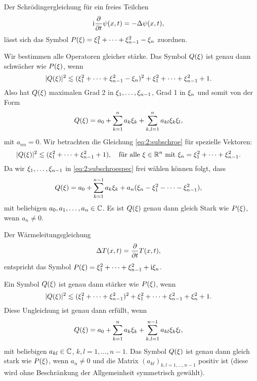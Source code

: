 \begin{exa}\label{exa:schroe}
Der Schrödingergleichung für ein freies Teilchen
\begin{equation}
\mathrm i\frac{\partial}{\partial t}\psi(x,t)=-\Delta\psi(x,t),\end{equation}
lässt sich das Symbol $P(\xi)=\xi^2_1+\dots+\xi^2_{n-1}-\xi_n$ zuordnen.

Wir bestimmen alle Operatoren gleicher stärke.
Das Symbol $Q(\xi)$ ist genau dann schwächer wie $P(\xi)$,
wenn
\begin{equation}\label{eq:2:subschroe}
\abs{Q(\x)}^2\apprle(\x^2_1+\dots+\x^2_{n-1}-\x_n)^2+\x^2_1+\dots+\x^2_{n-1}+1.
\end{equation}
Also hat $Q(\xi)$ maximalen Grad 2 in $\xi_1,\dots,\xi_{n-1}$,
Grad 1 in $\xi_n$ und somit von der Form
\begin{equation}
Q(\xi)=a_0+\sum^n_{k=1}a_k\xi_k+\sum^n_{k,l=1}a_{kl}\xi_k\xi_l,
\end{equation}
mit $a_{nn}=0$.
Wir betrachten die Gleichung \eqref{eq:2:subschroe}
für spezielle Vektoren:
\begin{equation}\label{eq:2:subschroespec}
\abs{Q(\x)}^2\apprle(\x^2_1+\dots+\x^2_{n-1}+1),
\quad\text{für alle}~\x\in\R^n~\text{mit}~\x_n=\x^2_1+\dots+\x^2_{n-1}.
\end{equation}
Da wir $\xi_1,\dots,\xi_{n-1}$ in \eqref{eq:2:subschroespec} frei wählen können folgt, dass
\begin{equation}
Q(\xi)=a_0+\sum_{k=1}^{n-1}a_k\xi_k+a_n(\xi_n-\xi^2_1-\dots-\xi^2_{n-1}),
\end{equation}
mit beliebigen $a_0,a_1,\dots,a_n\in\mathbb C$.
Es ist $Q(\xi)$ genau dann gleich Stark wie $P(\xi)$,
wenn $a_n\neq0$.
\end{exa}

\begin{exa}\label{exa:heat}
Der Wärmeleitungsgleichung
\begin{equation}
\Delta T(x,t)=\frac{\partial}{\partial t}T(x,t),
\end{equation}
entspricht das Symbol $P(\xi)=\xi^2_1+\dots+\xi^2_{n-1}+\mathrm i\xi_n$.

Ein Symbol $Q(\xi)$ ist genau dann stärker wie $P(\xi)$, wenn
\begin{equation}
\abs{Q(\x)}^2\apprle(\x^2_1+\dots+\x^2_{n-1})^2+\x^2_1+\dots+\x^2_{n-1}+\x^2_n+1.
\end{equation}
Diese Ungleichung ist genau dann erfüllt, wenn
\begin{equation}
Q(\xi)=a_0+\sum_{k=1}^na_k\xi_k+\sum_{k,l=1}^{n-1}a_{kl}\xi_k\xi_l,
\end{equation}
mit beliebigen $a_{kl}\in\mathbb C$, $k,l=1,\dots,n-1$.
Das Symbol $Q(\xi)$ ist genau dann gleich stark wie $P(\xi)$,
wenn $a_n\neq0$ und die Matrix $(a_{kl})_{k,l=1,\dots,n-1}$ positiv ist
(diese wird ohne Beschränkung der Allgemeinheit symmetrisch gewählt).
\end{exa}

